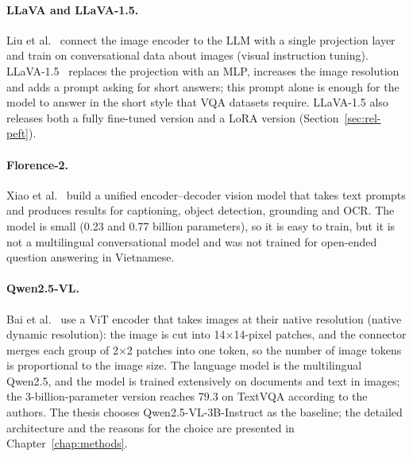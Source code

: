 \paragraph{LLaVA and LLaVA-1.5.} Liu et al.~\cite{liu2023llava} connect the image
encoder to the LLM with a single projection layer and train on conversational data
about images (visual instruction tuning). LLaVA-1.5~\cite{liu2024llava15} replaces the
projection with an MLP, increases the image resolution and adds a prompt asking for
short answers; this prompt alone is enough for the model to answer in the short style
that VQA datasets require. LLaVA-1.5 also releases both a fully fine-tuned version and
a LoRA version (Section~\ref{sec:rel-peft}).

\paragraph{Florence-2.} Xiao et al.~\cite{xiao2024florence2} build a unified
encoder--decoder vision model that takes text prompts and produces results for
captioning, object detection, grounding and OCR. The model is small (0.23 and
0.77 billion parameters), so it is easy to train, but it is not a multilingual
conversational model and was not trained for open-ended question answering in
Vietnamese.

\paragraph{Qwen2.5-VL.} Bai et al.~\cite{bai2025qwen25vl} use a ViT encoder that takes
images at their native resolution (native dynamic resolution): the image is cut into
14×14-pixel patches, and the connector merges each group of 2×2 patches into one token,
so the number of image tokens is proportional to the image size. The language model is
the multilingual Qwen2.5, and the model is trained extensively on documents and text in
images; the 3-billion-parameter version reaches 79.3 on TextVQA according to the
authors. The thesis chooses Qwen2.5-VL-3B-Instruct as the baseline; the detailed
architecture and the reasons for the choice are presented in Chapter~\ref{chap:methods}.

